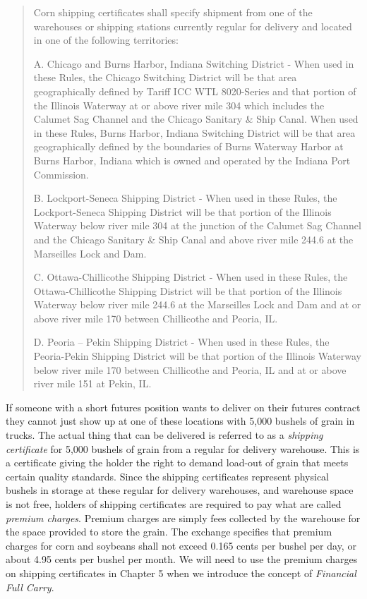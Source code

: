 \documentclass[
  letterpaper,
  DIV=11,
  numbers=noendperiod]{scrreprt}
\begin{document}
\begin{quote}
Corn shipping certificates shall specify shipment from one of the
warehouses or shipping stations currently regular for delivery and
located in one of the following territories:

A. Chicago and Burns Harbor, Indiana Switching District - When used in
these Rules, the Chicago Switching District will be that area
geographically defined by Tariff ICC WTL 8020-Series and that portion of
the Illinois Waterway at or above river mile 304 which includes the
Calumet Sag Channel and the Chicago Sanitary \& Ship Canal. When used in
these Rules, Burns Harbor, Indiana Switching District will be that area
geographically defined by the boundaries of Burns Waterway Harbor at
Burns Harbor, Indiana which is owned and operated by the Indiana Port
Commission.

B. Lockport-Seneca Shipping District - When used in these Rules, the
Lockport-Seneca Shipping District will be that portion of the Illinois
Waterway below river mile 304 at the junction of the Calumet Sag Channel
and the Chicago Sanitary \& Ship Canal and above river mile 244.6 at the
Marseilles Lock and Dam.

C. Ottawa-Chillicothe Shipping District - When used in these Rules, the
Ottawa-Chillicothe Shipping District will be that portion of the
Illinois Waterway below river mile 244.6 at the Marseilles Lock and Dam
and at or above river mile 170 between Chillicothe and Peoria, IL.

D. Peoria -- Pekin Shipping District - When used in these Rules, the
Peoria-Pekin Shipping District will be that portion of the Illinois
Waterway below river mile 170 between Chillicothe and Peoria, IL and at
or above river mile 151 at Pekin, IL.
\end{quote}

If someone with a short futures position wants to deliver on their
futures contract they cannot just show up at one of these locations with
5,000 bushels of grain in trucks. The actual thing that can be delivered
is referred to as a \emph{shipping certificate} for 5,000 bushels of
grain from a regular for delivery warehouse. This is a certificate
giving the holder the right to demand load-out of grain that meets
certain quality standards. Since the shipping certificates represent
physical bushels in storage at these regular for delivery warehouses,
and warehouse space is not free, holders of shipping certificates are
required to pay what are called \emph{premium charges}. Premium charges
are simply fees collected by the warehouse for the space provided to
store the grain. The exchange specifies that premium charges for corn
and soybeans shall not exceed 0.165 cents per bushel per day, or about
4.95 cents per bushel per month. We will need to use the premium charges
on shipping certificates in Chapter 5 when we introduce the concept of
\emph{Financial Full Carry}.
\end{document}
